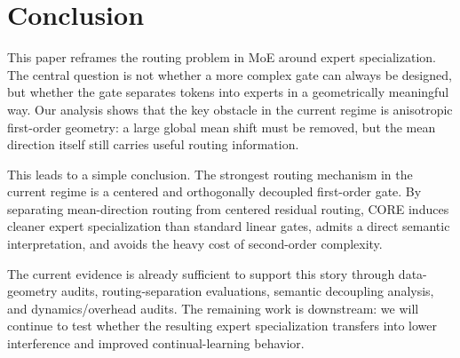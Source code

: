 \section{Conclusion}
\label{sec:conclusion}

This paper reframes the routing problem in MoE around expert specialization. The central question is not whether a more complex gate can always be designed, but whether the gate separates tokens into experts in a geometrically meaningful way. Our analysis shows that the key obstacle in the current regime is anisotropic first-order geometry: a large global mean shift must be removed, but the mean direction itself still carries useful routing information.

This leads to a simple conclusion. The strongest routing mechanism in the current regime is a centered and orthogonally decoupled first-order gate. By separating mean-direction routing from centered residual routing, CORE induces cleaner expert specialization than standard linear gates, admits a direct semantic interpretation, and avoids the heavy cost of second-order complexity.

The current evidence is already sufficient to support this story through data-geometry audits, routing-separation evaluations, semantic decoupling analysis, and dynamics/overhead audits. The remaining work is downstream: we will continue to test whether the resulting expert specialization transfers into lower interference and improved continual-learning behavior.
